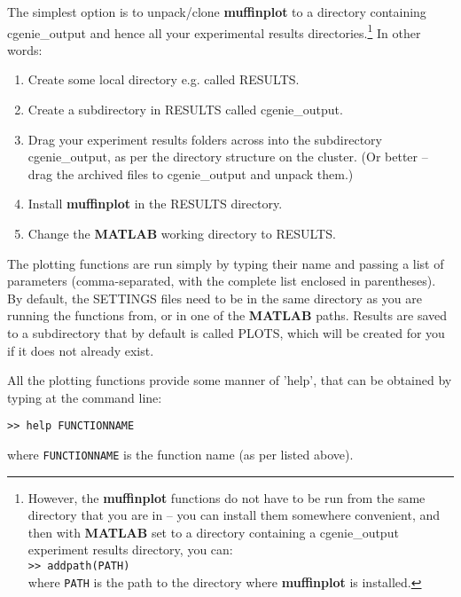\documentclass[11pt,fleqn]{book} %
\begin{document}
The simplest option is to unpack/clone \textbf{muffinplot} to a directory containing \footnotesize\textsf{cgenie\_output }\normalsize and hence all your experimental results directories.\footnote{However, the \textbf{muffinplot} functions do not have to be run from the same directory that you are in -- you can install them somewhere convenient, and then with \textbf{MATLAB} set to a directory containing a \textsf{cgenie\_output} experiment results directory, you can:
\\\texttt{>> addpath(PATH)}
\\where \texttt{PATH} is the path to the directory where \textbf{muffinplot} is installed.}
In other words:
\begin{enumerate}[noitemsep]
\vspace{1mm}
\item Create some local directory e.g. called \footnotesize\textsf{RESULTS}\normalsize.
\vspace{1mm}
\item Create a subdirectory in \footnotesize\textsf{RESULTS }\normalsize called \footnotesize\textsf{cgenie\_output}\normalsize.
\vspace{1mm}
\item Drag your experiment results folders across into the subdirectory \footnotesize\textsf{cgenie\_output}\normalsize, as per the directory structure on the cluster. (Or better -- drag the archived files to  \footnotesize\textsf{cgenie\_output }\normalsize and unpack them.)
\vspace{1mm}
\item Install \textbf{muffinplot} in the \footnotesize\textsf{RESULTS }\normalsize directory.
\vspace{1mm}
\item Change the \textbf{MATLAB} working directory to \footnotesize\textsf{RESULTS}\normalsize.
\end{enumerate}
\vspace{2mm}

The plotting functions are run simply by typing their name and passing a list of parameters (comma-separated, with the complete list enclosed in parentheses). By default,   the \footnotesize\textsf{SETTINGS }\normalsize files need to be in the same directory as you are running the functions from, or in one of the \textbf{MATLAB} paths. Results are saved to a subdirectory that by default is called \footnotesize\textsf{PLOTS}\normalsize, which will be created for you if it does not already exist.

All the plotting functions provide some manner of 'help', that can be obtained by typing at the command line:
\vspace{-2pt}\begin{verbatim}
>> help FUNCTIONNAME
\end{verbatim}\vspace{-2pt}
where \texttt{FUNCTIONNAME} is the function name (as per listed above).
\end{document}
